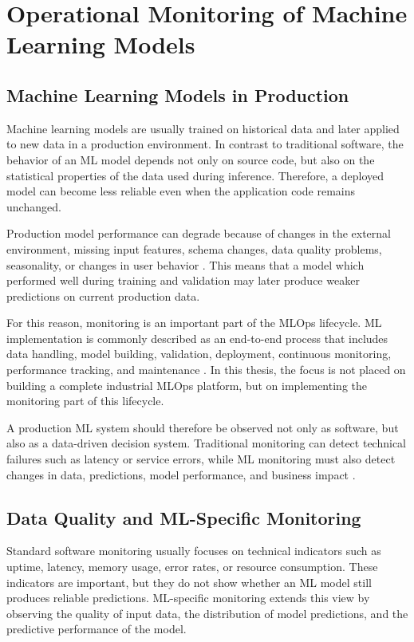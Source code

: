 \chapter{Operational Monitoring of Machine Learning Models}
\label{ch:operational-monitoring}

\section{Machine Learning Models in Production}

Machine learning models are usually trained on historical data and later applied to new data in a production environment. In contrast to traditional software, the behavior of an ML model depends not only on source code, but also on the statistical properties of the data used during inference. Therefore, a deployed model can become less reliable even when the application code remains unchanged.

Production model performance can degrade because of changes in the external environment, missing input features, schema changes, data quality problems, seasonality, or changes in user behavior \cite{MonitoringPerformance}. This means that a model which performed well during training and validation may later produce weaker predictions on current production data.

For this reason, monitoring is an important part of the MLOps lifecycle. ML implementation is commonly described as an end-to-end process that includes data handling, model building, validation, deployment, continuous monitoring, performance tracking, and maintenance \cite{MachineLearningModelinProduction}. In this thesis, the focus is not placed on building a complete industrial MLOps platform, but on implementing the monitoring part of this lifecycle.

A production ML system should therefore be observed not only as software, but also as a data-driven decision system. Traditional monitoring can detect technical failures such as latency or service errors, while ML monitoring must also detect changes in data, predictions, model performance, and business impact \cite{MonitoringObservabilityMLSystems}.

\section{Data Quality and ML-Specific Monitoring}

Standard software monitoring usually focuses on technical indicators such as uptime, latency, memory usage, error rates, or resource consumption. These indicators are important, but they do not show whether an ML model still produces reliable predictions. ML-specific monitoring extends this view by observing the quality of input data, the distribution of model predictions, and the predictive performance of the model.

